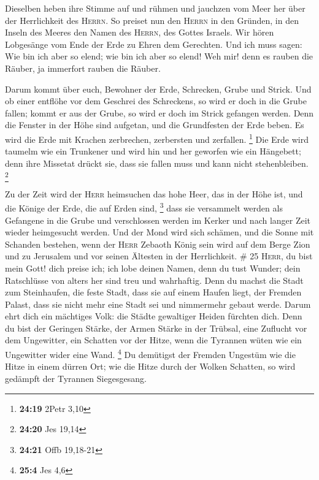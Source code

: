  Dieselben heben ihre Stimme auf und rühmen und jauchzen
vom Meer her über der Herrlichkeit des \textsc{Herrn}. 
So preiset nun den \textsc{Herrn} in den Gründen, in den Inseln des
Meeres den Namen des \textsc{Herrn}, des Gottes Israels. 
Wir hören Lobgesänge vom Ende der Erde zu Ehren dem Gerechten. Und ich
muss sagen: Wie bin ich aber so elend; wie bin ich aber so elend! Weh
mir! denn es rauben die Räuber, ja immerfort rauben die Räuber.

 Darum kommt über euch, Bewohner der Erde, Schrecken,
Grube und Strick.  Und ob einer entflöhe vor dem Geschrei
des Schreckens, so wird er doch in die Grube fallen; kommt er aus der
Grube, so wird er doch im Strick gefangen werden. Denn die Fenster in
der Höhe sind aufgetan, und die Grundfesten der Erde beben.
 Es wird die Erde mit Krachen zerbrechen, zerbersten und
zerfallen. \footnote{\textbf{24:19} 2Petr 3,10}  Die Erde
wird taumelm wie ein Trunkener und wird hin und her geworfen wie ein
Hängebett; denn ihre Missetat drückt sie, dass sie fallen muss und kann
nicht stehenbleiben. \footnote{\textbf{24:20} Jes 19,14}

 Zu der Zeit wird der \textsc{Herr} heimsuchen das hohe
Heer, das in der Höhe ist, und die Könige der Erde, die auf Erden sind,
\footnote{\textbf{24:21} Offb 19,18-21}  dass sie
versammelt werden als Gefangene in die Grube und verschlossen werden im
Kerker und nach langer Zeit wieder heimgesucht werden. 
Und der Mond wird sich schämen, und die Sonne mit Schanden bestehen,
wenn der \textsc{Herr} Zebaoth König sein wird auf dem Berge Zion und zu
Jerusalem und vor seinen Ältesten in der Herrlichkeit. \# 25
 \textsc{Herr}, du bist mein Gott! dich preise ich; ich
lobe deinen Namen, denn du tust Wunder; dein Ratschlüsse von alters her
sind treu und wahrhaftig.  Denn du machst die Stadt zum
Steinhaufen, die feste Stadt, dass sie auf einem Haufen liegt, der
Fremden Palast, dass sie nicht mehr eine Stadt sei und nimmermehr gebaut
werde.  Darum ehrt dich ein mächtiges Volk: die Städte
gewaltiger Heiden fürchten dich.  Denn du bist der
Geringen Stärke, der Armen Stärke in der Trübsal, eine Zuflucht vor dem
Ungewitter, ein Schatten vor der Hitze, wenn die Tyrannen wüten wie ein
Ungewitter wider eine Wand. \footnote{\textbf{25:4} Jes 4,6}
 Du demütigst der Fremden Ungestüm wie die Hitze in einem
dürren Ort; wie die Hitze durch der Wolken Schatten, so wird gedämpft
der Tyrannen Siegesgesang.

